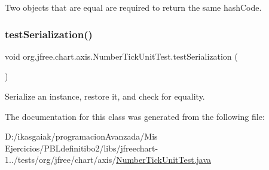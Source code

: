 Two objects that are equal are required to return the same hash\+Code. \mbox{\label{classorg_1_1jfree_1_1chart_1_1axis_1_1_number_tick_unit_test_a3891f5b3736e71921091df9d62c6a283}} 
\subsubsection{\texorpdfstring{test\+Serialization()}{testSerialization()}}
{\footnotesize\ttfamily void org.\+jfree.\+chart.\+axis.\+Number\+Tick\+Unit\+Test.\+test\+Serialization (\begin{DoxyParamCaption}{ }\end{DoxyParamCaption})}

Serialize an instance, restore it, and check for equality. 

The documentation for this class was generated from the following file\+:\begin{DoxyCompactItemize}
\item 
D\+:/ikasgaiak/programacion\+Avanzada/\+Mis Ejercicios/\+P\+B\+Ldefinitibo2/libs/jfreechart-\/1../tests/org/jfree/chart/axis/\mbox{\hyperlink{_number_tick_unit_test_8java}{Number\+Tick\+Unit\+Test.\+java}}\end{DoxyCompactItemize}
